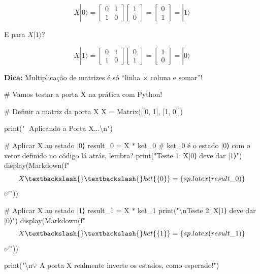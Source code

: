\documentclass[
  brazilian,
]{report}
\newenvironment{Shaded}{\begin{snugshade}}{\end{snugshade}}
\newcommand{\NormalTok}[1]{\textcolor[rgb]{0.00,0.23,0.31}{#1}}
\begin{document}
\[X|0⟩ = \begin{bmatrix} 0 & 1 \\ 1 & 0 \end{bmatrix} \begin{bmatrix} 1 \\ 0 \end{bmatrix} = \begin{bmatrix} 0 \\ 1 \end{bmatrix} = |1⟩\]

E para \(X|1⟩\)?

\[X|1⟩ = \begin{bmatrix} 0 & 1 \\ 1 & 0 \end{bmatrix} \begin{bmatrix} 0 \\ 1 \end{bmatrix} = \begin{bmatrix} 1 \\ 0 \end{bmatrix} = |0⟩\]

\textbf{Dica:} Multiplicação de matrizes é só ``linha × coluna e
somar''!

\begin{Shaded}
\begin{Highlighting}[]

\NormalTok{\# Vamos testar a porta X na prática com Python!}

\NormalTok{\# Definir a matriz da porta X}
\NormalTok{X = Matrix([[0, 1],}
\NormalTok{            [1, 0]])}

\NormalTok{print("🔄 Aplicando a Porta X...\textbackslash{}n")}

\NormalTok{\# Aplicar X ao estado |0⟩}
\NormalTok{result\_0 = X * ket\_0        \# ket\_0 é o estado |0⟩ com o vetor definido no código lá atrás, lembra?}
\NormalTok{print("Teste 1: X|0⟩ deve dar |1⟩")}
\NormalTok{display(Markdown(f"$$X \textbackslash{}\textbackslash{}ket\{\{0\}\} = \{sp.latex(result\_0)\}$$ ✅"))}

\NormalTok{\# Aplicar X ao estado |1⟩}
\NormalTok{result\_1 = X * ket\_1}
\NormalTok{print("\textbackslash{}nTeste 2: X|1⟩ deve dar |0⟩")}
\NormalTok{display(Markdown(f"$$X \textbackslash{}\textbackslash{}ket\{\{1\}\} = \{sp.latex(result\_1)\}$$ ✅"))}

\NormalTok{print("\textbackslash{}n💡 A porta X realmente inverte os estados, como esperado!")}
\end{Highlighting}
\end{Shaded}
\end{document}
